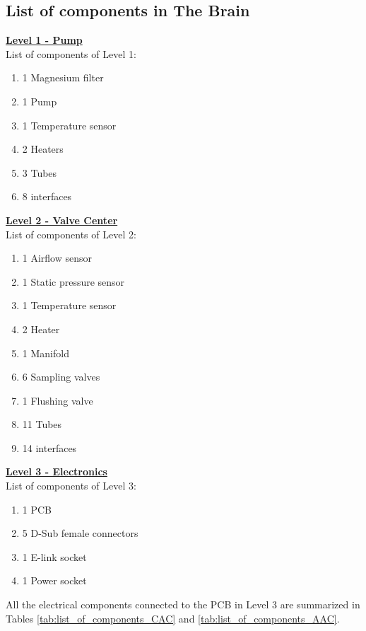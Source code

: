 \subsection{List of components in The Brain}
\label{list-of-components-brain}
\textbf{\underline{Level 1 - Pump}}
\\
List of components of Level 1:

\begin{enumerate}[label=\Alph*.]
    \item 1 Magnesium filter
    \item 1 Pump
    \item 1 Temperature sensor
    \item 2 Heaters
    \item 3 Tubes
    \item 8 interfaces
\end{enumerate}

\textbf{\underline{Level 2 - Valve Center}}
\\
List of components of Level 2:

\begin{enumerate}[label=\Alph*.]
    \item 1 Airflow sensor
    \item 1 Static pressure sensor
    \item 1 Temperature sensor
    \item 2 Heater
    \item 1 Manifold
    \item 6 Sampling valves
    \item 1 Flushing valve
    \item 11 Tubes
    \item 14 interfaces
\end{enumerate}

\textbf{\underline{Level 3 - Electronics}}
\\
List of components of Level 3:
\begin{enumerate}[label=\Alph*.]
    \item 1 PCB
    \item 5 D-Sub female connectors
    \item 1 E-link socket
    \item 1 Power socket
\end{enumerate}
All the electrical components connected to the PCB in Level 3 are summarized in Tables \ref{tab:list_of_components_CAC} and \ref{tab:list_of_components_AAC}. 


